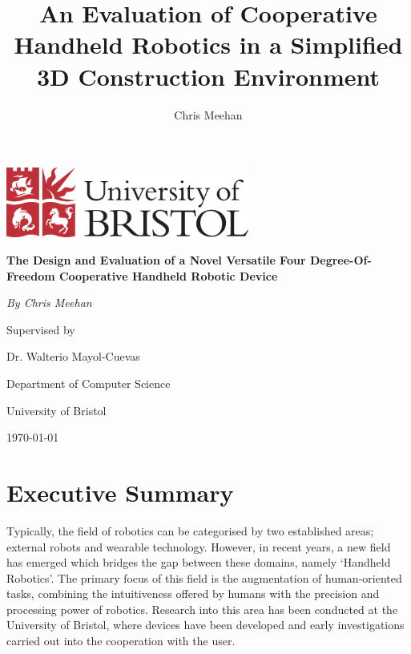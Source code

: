 \documentclass[11pt]{article}
\title{An Evaluation of Cooperative Handheld Robotics in a Simplified 3D Construction Environment}
\author{Chris Meehan}
\begin{document}
\begin{titlepage}
	\centering
	
	\includegraphics[width=0.6\textwidth]{bristol.png}
	\vspace{2cm}

	{\huge\bfseries The Design and Evaluation of a Novel Versatile Four Degree-Of-Freedom Cooperative Handheld Robotic Device\par}
	\vspace{1.5cm}

	{\Large\itshape By Chris Meehan\par}
	
	Supervised by\par
	Dr. Walterio Mayol-Cuevas
	
	\vspace{1.5cm}
	
	Department of Computer Science\par
	University of Bristol

	\vfill

	{\large \today\par}
\end{titlepage}

\renewcommand{\thepage}{\roman{page}}%



\section*{Executive Summary}

Typically, the field of robotics can be categorised by two established areas; external robots and wearable technology. However, in recent years, a new field has emerged which bridges the gap between these domains, namely `Handheld Robotics'. The primary focus of this field is the augmentation of human-oriented tasks, combining the intuitiveness offered by humans with the precision and processing power of robotics. Research into this area has been conducted at the University of Bristol, where devices have been developed and early investigations carried out into the cooperation with the user.
\end{document}
